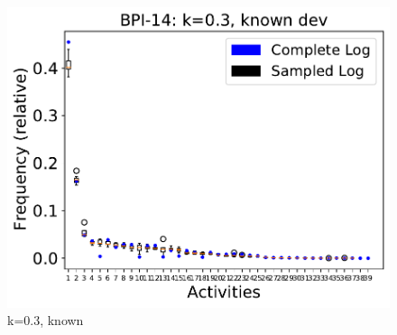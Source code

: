 \documentclass[landscape]{article}
\begin{document}
\begin{figure}[!htb]
	\hfill
	\begin{minipage}{0.2\textwidth}
		\includegraphics[width=1.0\textwidth]{../Detail_Incident_Activity/Detail_Incident_Activity_deviationsApprox_0.3_NONALIGNING_KNOWN.pdf}
		\caption{k=0.3, known}
	\end{minipage}
\end{figure}
\end{document}
